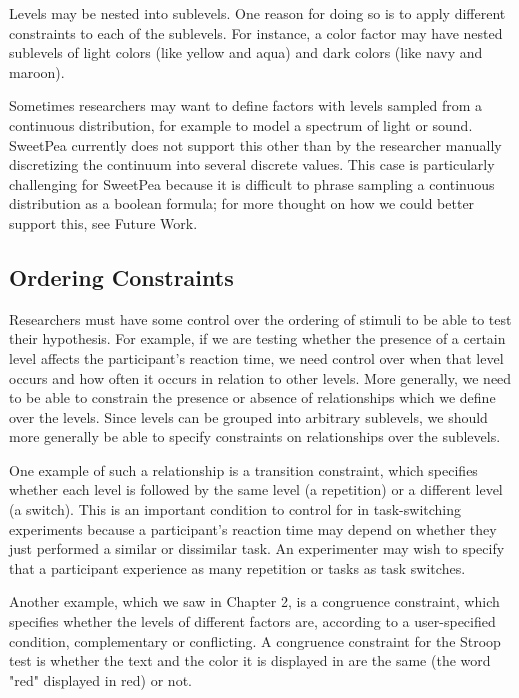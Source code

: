 Levels may be nested into sublevels. One reason for doing so is to apply different constraints to each of the sublevels. For instance, a color factor may have nested sublevels of light colors (like yellow and aqua) and dark colors (like navy and maroon).

Sometimes researchers may want to define factors with levels sampled from a continuous distribution, for example to model a spectrum of light or sound. SweetPea currently does not support this other than by the researcher manually discretizing the continuum into several discrete values. This case is particularly challenging for SweetPea because it is difficult to phrase sampling a continuous distribution as a boolean formula; for more thought on how we could better support this, see Future Work.

\subsection{Ordering Constraints}

Researchers must have some control over the ordering of stimuli to be able to test their hypothesis. For example, if we are testing whether the presence of a certain level affects the participant's reaction time, we need control over when that level occurs and how often it occurs in relation to other levels. More generally, we need to be able to constrain the presence or absence of relationships which we define over the levels. Since levels can be grouped into arbitrary sublevels, we should more generally be able to specify constraints on relationships over the sublevels.

One example of such a relationship is a transition constraint, which specifies whether each level is followed by the same level (a repetition) or a different level (a switch). This is an important condition to control for in task-switching experiments because a participant's reaction time may depend on whether they just performed a similar or dissimilar task. An experimenter may wish to specify that a participant experience as many repetition or tasks as task switches.

Another example, which we saw in Chapter 2, is a congruence constraint, which specifies whether the levels of different factors are, according to a user-specified condition, complementary or conflicting. A congruence constraint for the Stroop test is whether the text and the color it is displayed in are the same (the word "red" displayed in red) or not.

